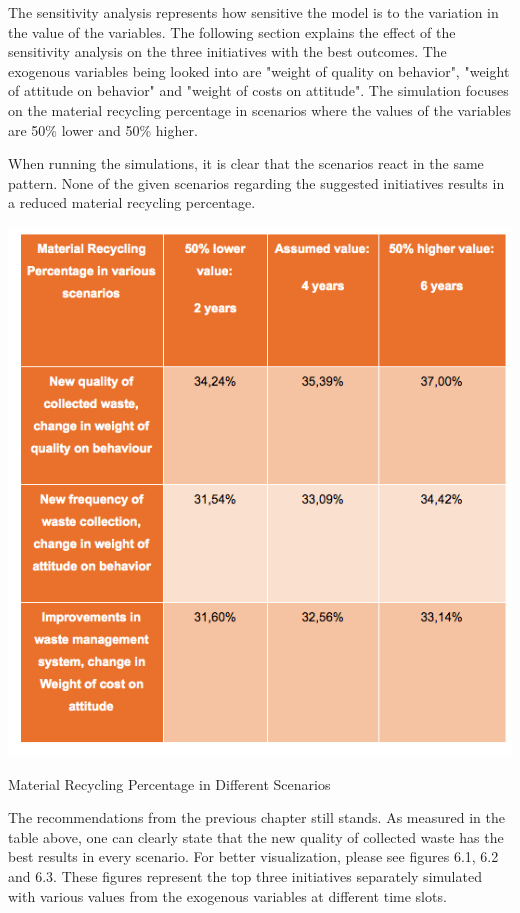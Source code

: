 The sensitivity analysis represents how sensitive the model is to the variation in the value of the variables. The following section explains the effect of the sensitivity analysis on the three initiatives with the best outcomes. The exogenous variables being looked into are "weight of quality on behavior", "weight of attitude on behavior" and "weight of costs on attitude". The simulation focuses on the material recycling percentage in scenarios where the values of the variables are 50\% lower and 50\% higher. 

\indent \newline
When running the simulations, it is clear that the scenarios react in the same pattern. None of the given scenarios regarding the suggested initiatives results in a reduced material recycling percentage.

\begin{table}[H]
\centering
\includegraphics [scale=0.50,angle=360]{tables/scenarios.png}
\caption{Material Recycling Percentage in Different Scenarios}
\label{tbl:scenarios}
\end{table}

\indent \newline
The recommendations from the previous chapter still stands. As measured in the table above, one can clearly state that the new quality of collected waste has the best results in every scenario. For better visualization, please see figures 6.1, 6.2 and 6.3. These figures represent the top three initiatives separately simulated with various values from the exogenous variables at different time slots. 

